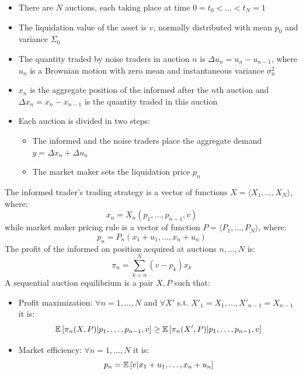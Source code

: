 \begin{mysetting}
	\begin{itemize}
		\item There are $N$ auctions, each taking place at time $0=t_0<\ldots<t_N=1$
		\item The liquidation value of the asset is $v$, normally distributed with mean $p_0$ and
		variance $\Sigma_0$
		\item The quantity traded by noise traders in auction $n$ is $\Delta u_n = u_n - u_{n-1}$, where $u_n$ is a Brownian motion with zero mean and instantaneous variance $\sigma^2_u$
		\item $x_n$ is the aggregate position of the informed after the $n$th auction and $\Delta x_n = x_n - x_{n-1}$ is the quantity traded in this auction
	\end{itemize}
\end{mysetting}
\begin{mysetting}
	\begin{itemize}
				\item Each auction is divided in two steps:
		\begin{itemize}
			\item The informed and the noise traders place the aggregate demand $y = \Delta x_n + \Delta u_n$
			\item The market maker sets the liquidation price $p_n$
		\end{itemize}
	\end{itemize}
\end{mysetting}
The informed trader's trading strategy is a vector of functions $X = \langle X_1,\ldots,X_N \rangle$, where:
\[
x_n = X_n(p_1,\ldots,p_{n-1},v)
\]
while market maker pricing rule is a vector of function $P = \langle P_1,\ldots,P_N \rangle$, where:
\[
p_n = P_n(x_1+u_1,\ldots,x_n+u_n)
\]
The profit of the informed on position acquired at auctions $n,\ldots,N$ is:
\[
\pi_n = \sum_{k=n}^{N} (v-p_k)x_k
\]
A sequential auction equilibrium is a pair $X,P$ such that:
\begin{itemize}
	\item Profit maximization: $\forall n =1,\ldots,N$ and $\forall X'$ s.t. $X'_1 =X_1,\ldots,X'_{n-1} = X_{n-1}$ it is:
	\[
	\mathbb{E}\left[\pi_n(X,P)|p_1,\ldots,p_{n-1},v\right] \geq \mathbb{E}\left[\pi_n(X',P)|p_1,\ldots,p_{n-1},v\right]
	\]
	\item Market efficiency: $\forall n = 1,\ldots,N$ it is:
	\[
	p_n = \mathbb{E}\left[v|x_1 + u_1,\ldots, x_n + u_n\right]
	\]
\end{itemize}
